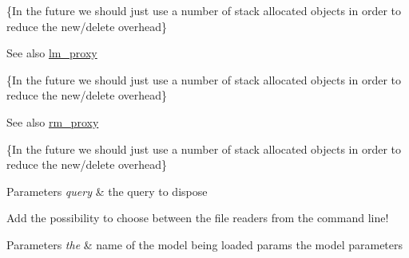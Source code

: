 \begin{DoxyRefList}
\item[\label{todo__todo000010}%
\hypertarget{todo__todo000010}{}%
Member \hyperlink{classuva_1_1smt_1_1bpbd_1_1server_1_1lm_1_1proxy_1_1lm__proxy__local_a2702b2498c14bc79df89484893ee3fc7}{uva\+:\+:smt\+:\+:bpbd\+:\+:server\+:\+:lm\+:\+:proxy\+:\+:lm\+\_\+proxy\+\_\+local\+:\+:dispose\+\_\+slow\+\_\+query\+\_\+proxy} (\hyperlink{classuva_1_1smt_1_1bpbd_1_1server_1_1lm_1_1proxy_1_1lm__slow__query__proxy}{lm\+\_\+slow\+\_\+query\+\_\+proxy} \&query)]\{In the future we should just use a number of stack allocated objects in order to reduce the new/delete overhead\} \begin{DoxySeeAlso}{See also}
\hyperlink{classuva_1_1smt_1_1bpbd_1_1server_1_1lm_1_1proxy_1_1lm__proxy}{lm\+\_\+proxy}  
\end{DoxySeeAlso}

\item[\label{todo__todo000012}%
\hypertarget{todo__todo000012}{}%
Member \hyperlink{classuva_1_1smt_1_1bpbd_1_1server_1_1rm_1_1proxy_1_1rm__proxy__local_a697c5402937d2f3f55500ed1c2074fc7}{uva\+:\+:smt\+:\+:bpbd\+:\+:server\+:\+:rm\+:\+:proxy\+:\+:rm\+\_\+proxy\+\_\+local\+:\+:allocate\+\_\+query\+\_\+proxy} ()]\{In the future we should just use a number of stack allocated objects in order to reduce the new/delete overhead\} \begin{DoxySeeAlso}{See also}
\hyperlink{classuva_1_1smt_1_1bpbd_1_1server_1_1rm_1_1proxy_1_1rm__proxy}{rm\+\_\+proxy}  
\end{DoxySeeAlso}

\item[\label{todo__todo000013}%
\hypertarget{todo__todo000013}{}%
Member \hyperlink{classuva_1_1smt_1_1bpbd_1_1server_1_1rm_1_1proxy_1_1rm__proxy__local_a3a26102b7b9b3ecc4d1a8627751406a6}{uva\+:\+:smt\+:\+:bpbd\+:\+:server\+:\+:rm\+:\+:proxy\+:\+:rm\+\_\+proxy\+\_\+local\+:\+:dispose\+\_\+query\+\_\+proxy} (\hyperlink{classuva_1_1smt_1_1bpbd_1_1server_1_1rm_1_1proxy_1_1rm__query__proxy}{rm\+\_\+query\+\_\+proxy} \&query)]\{In the future we should just use a number of stack allocated objects in order to reduce the new/delete overhead\} 
\begin{DoxyParams}{Parameters}
{\em query} & the query to dispose  \\
\hline
\end{DoxyParams}

\item[\label{todo__todo000014}%
\hypertarget{todo__todo000014}{}%
Member \hyperlink{classuva_1_1smt_1_1bpbd_1_1server_1_1rm_1_1proxy_1_1rm__proxy__local_a29f305210313916e132a2ecee15891d4}{uva\+:\+:smt\+:\+:bpbd\+:\+:server\+:\+:rm\+:\+:proxy\+:\+:rm\+\_\+proxy\+\_\+local\+:\+:load\+\_\+model\+\_\+data} (char const $\ast$model\+\_\+name, const \hyperlink{structuva_1_1smt_1_1bpbd_1_1server_1_1rm_1_1rm__parameters}{rm\+\_\+parameters} \&params)]Add the possibility to choose between the file readers from the command line! 
\begin{DoxyParams}{Parameters}
{\em the} & name of the model being loaded  params the model parameters  \\
\hline
\end{DoxyParams}


\end{DoxyRefList}
